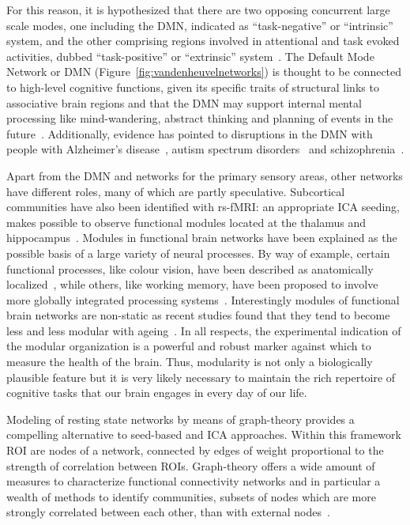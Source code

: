 For this reason, it is hypothesized that there are two opposing concurrent large scale modes, one including the DMN, indicated as ``task-negative'' or ``intrinsic'' system, and the other comprising regions involved in attentional and task evoked activities, dubbed ``task-positive'' or ``extrinsic'' system~\cite{power2011,fox2002,golland2008}.
The Default Mode Network or DMN (Figure~\ref{fig:vandenheuvelnetworks}) is thought to be connected to high-level cognitive functions, given its specific traits of structural links to associative brain regions and that the DMN may support internal mental processing like mind-wandering, abstract thinking and planning of events in the future~\cite{gusnard2001,buckner2008}.
Additionally, evidence has pointed to disruptions in the DMN with people with Alzheimer's disease~\cite{buckner2008}, autism spectrum disorders~\cite{washington2014} and schizophrenia~\cite{garrity2007}.

Apart from the DMN and networks for the primary sensory areas, other networks have different roles, many of which are partly speculative.
Subcortical communities have also been identified with rs-fMRI: an appropriate ICA seeding, makes possible to observe functional modules located at the thalamus and hippocampus~\cite{lee2012}.
Modules in functional brain networks have been explained as the possible basis of a large variety of neural processes.
By way of example, certain functional processes, like colour vision, have been described as anatomically localized~\cite{zeki1998}, while others, like working memory, have been proposed to involve more globally integrated processing systems~\cite{dehaene1998,baddeley2003}.
Interestingly modules of functional brain networks are non-static as recent studies found that they tend to become less and less modular with ageing~\cite{meunier2009a,song2014}.
In all respects, the experimental indication of the modular organization is a powerful and robust marker against which to measure the health of the brain. 
Thus, modularity is not only a biologically plausible feature but it is very likely necessary to maintain the rich repertoire of cognitive tasks that our brain engages in every day of our life.

Modeling of resting state networks by means of graph-theory provides a compelling alternative to seed-based and ICA approaches.
Within this framework ROI are nodes of a network, connected by edges of weight proportional to the strength of correlation between ROIs.
Graph-theory offers a wide amount of measures to characterize functional connectivity networks and in particular a wealth of methods to identify communities, subsets of nodes which are more strongly correlated between each other, than with external nodes~\cite{bullmore2009,stam2014,sporns2016}.

